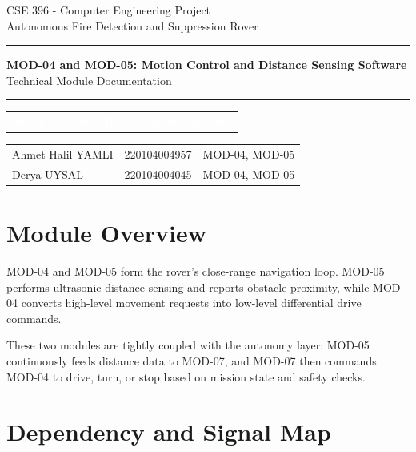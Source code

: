 \documentclass[a4paper,11pt]{article}
\newcommand{\theadtext}[1]{\textcolor{white}{\textbf{#1}}}
\begin{document}
\textcolor{textgray}{\small CSE 396 - Computer Engineering Project}\\
\textcolor{textgray}{\small Autonomous Fire Detection and Suppression Rover}

\vspace{8pt}
{\color{accent}\rule{\linewidth}{2pt}}
\vspace{6pt}

{\LARGE\bfseries\color{accent} MOD-04 and MOD-05: Motion Control and Distance Sensing Software}\\[4pt]
{\large Technical Module Documentation}

\vspace{4pt}
{\color{textgray}\rule{\linewidth}{0.5pt}}
\vspace{10pt}

\begin{tabular}{
  >{}L{6.46cm}
  >{}L{4.25cm}
  >{}L{5.3cm}
}
\theadtext{Name} & \theadtext{Student ID} & \theadtext{Assigned Modules} \\
\end{tabular}

\vspace{0pt}
\begin{tabular}{L{6.46cm} L{4.25cm} L{5.3cm}}
   Ahmet Halil YAMLI & 220104004957 & MOD-04, MOD-05 \\
 Derya UYSAL       & 220104004045 & MOD-04, MOD-05 \\
\end{tabular}

\vspace{16pt}

\section{Module Overview}

MOD-04 and MOD-05 form the rover's close-range navigation loop.
MOD-05 performs ultrasonic distance sensing and reports obstacle proximity,
while MOD-04 converts high-level movement requests into low-level differential
drive commands.

These two modules are tightly coupled with the autonomy layer:
MOD-05 continuously feeds distance data to MOD-07, and MOD-07 then commands
MOD-04 to drive, turn, or stop based on mission state and safety checks.

\section{Dependency and Signal Map}
\end{document}
